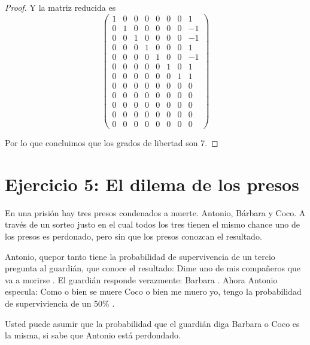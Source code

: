 \documentclass[paper=letter, fontsize=11pt]{scrartcl} %
\numberwithin{equation}{section} %
\numberwithin{figure}{section} %
\numberwithin{table}{section} %
\begin{document}
\begin{enumerate}[label = \arabic*)]
\begin{proof}
Y la matriz reducida es
\begin{equation}
\begin{pmatrix}
 1 & 0 & 0 & 0 & 0 & 0 & 0 & 1 \\
 0 & 1 & 0 & 0 & 0 & 0 & 0 & -1 \\
 0 & 0 & 1 & 0 & 0 & 0 & 0 & -1 \\
 0 & 0 & 0 & 1 & 0 & 0 & 0 & 1 \\
 0 & 0 & 0 & 0 & 1 & 0 & 0 & -1 \\
 0 & 0 & 0 & 0 & 0 & 1 & 0 & 1 \\
 0 & 0 & 0 & 0 & 0 & 0 & 1 & 1 \\
 0 & 0 & 0 & 0 & 0 & 0 & 0 & 0 \\
 0 & 0 & 0 & 0 & 0 & 0 & 0 & 0 \\
 0 & 0 & 0 & 0 & 0 & 0 & 0 & 0 \\
 0 & 0 & 0 & 0 & 0 & 0 & 0 & 0 \\
 0 & 0 & 0 & 0 & 0 & 0 & 0 & 0
\end{pmatrix} \nonumber
\end{equation}

Por lo que concluimos que los grados de libertad son 7.
\end{proof}
\end{enumerate}
\section{Ejercicio 5: El dilema de los presos}

En una prisión hay tres presos condenados a muerte. Antonio, Bárbara y Coco. A través de un sorteo justo en el cual todos los tres tienen el mismo chance uno de los presos es perdonado, pero sin que los presos conozcan el resultado.

Antonio, quepor tanto tiene la probabilidad de supervivencia de un tercio pregunta al guardián, que conoce el resultado:  Dime uno de mis compañeros que va a morirse . El guardián responde verazmente:  Barbara . Ahora Antonio especula:  Como o bien se muere Coco o bien me muero yo, tengo la probabilidad de superviviencia de un 50\% .

Usted puede asumir que la probabilidad que el guardián diga  Barbara  o  Coco  es la misma, si sabe que Antonio está perdondado.
\end{document}
